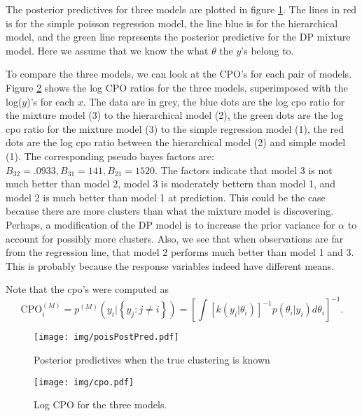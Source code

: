 \documentclass{article}
\def\beginmyfig{\begin{figure}[h]\center}
\def\endmyfig{\end{figure}}
\def\ds{\displaystyle}
\begin{document}
The posterior predictives for three models are plotted in figure \ref{fig:poisPostPred}.
The lines in red is for the simple poisson regression model, the line blue
is for the hierarchical model, and the green line represents the posterior
predictive for the DP mixture model. Here we assume that we know the
what $\theta$ the $y$'s belong to. 

To compare the three models, we can look at the CPO's for each pair of models.
Figure \ref{fig:cpo} shows the log CPO ratios for the three models,
superimposed with the log($y$)'s for each $x$. The data are in grey, the blue
dots are the log cpo ratio for the mixture model (3) to the hierarchical model
(2), the green dots are the log cpo ratio for the mixture model (3) to the
simple regression model (1), the red dots are the log cpo ratio between the
hierarchical model (2) and simple model (1). The corresponding pseudo bayes
factors are: $B_{32} = .0933, B_{31} =  141, B_{21} = 1520$. The factors
indicate that model 3 is not much better than model 2, model 3 is moderately
bettern than model 1, and model 2 is much better than model 1 at prediction.
This could be the case because there are more clusters than what the mixture model
is discovering. Perhaps, a modification of the DP model is to increase the prior 
variance for $\alpha$ to account for possibly more clusters. Also, we see that
when observations are far from the regression line, that model 2 performs much better
than model 1 and 3. This is probably because the response variables indeed have
different means. 

\noindent
Note that the cpo's were computed as 
\[
  \text{CPO}_i^{(M)} = p^{(M)}(y_i|\left\{y_j:j\ne i\right\}) = \ds\left[\int\left[k(y_i|\theta_i)\right]^{-1}p(\theta_i|y_i)d\theta_i\right]^{-1}.
\]

\beginmyfig
  \texttt{[image: img/poisPostPred.pdf]}
  \caption{Posterior predictives when the true clustering is known}
  \label{fig:poisPostPred}
\endmyfig

\noindent
\beginmyfig
  \texttt{[image: img/cpo.pdf]}
  \caption{Log CPO for the three models.}
  \label{fig:cpo}
\endmyfig
\end{document}
